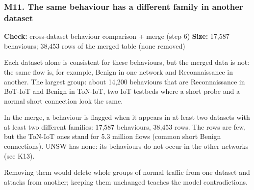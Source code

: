 \documentclass[10pt,a4paper]{article}
\newcommand{\meta}[2]{{\small\color{muted}\textbf{Check:} #1 \quad\textbar\quad \textbf{Size:} #2}}
\newenvironment{problem}{\par\noindent\begin{minipage}{\linewidth}\setlength{\parskip}{4pt}}{\end{minipage}\par\bigskip}
\begin{document}
\begin{problem}
\subsubsection*{M11. The same behaviour has a different family in another dataset}
\meta{cross-dataset behaviour comparison + merge (step 6)}{17,587 behaviours; 38,453 rows of the merged table (none removed)}

Each dataset alone is consistent for these behaviours, but the merged data is not: the same flow is, for example, Benign in one network and Reconnaissance in another. The largest group: about 14,200 behaviours that are Reconnaissance in BoT-IoT and Benign in ToN-IoT, two IoT testbeds where a short probe and a normal short connection look the same.

In the merge, a behaviour is flagged when it appears in at least two datasets with at least two different families: 17,587 behaviours, 38,453 rows. The rows are few, but the ToN-IoT ones stand for 5.3 million flows (common short Benign connections). UNSW has none: its behaviours do not occur in the other networks (see K13).

Removing them would delete whole groups of normal traffic from one dataset and attacks from another; keeping them unchanged teaches the model contradictions.


\end{problem}
\end{document}
